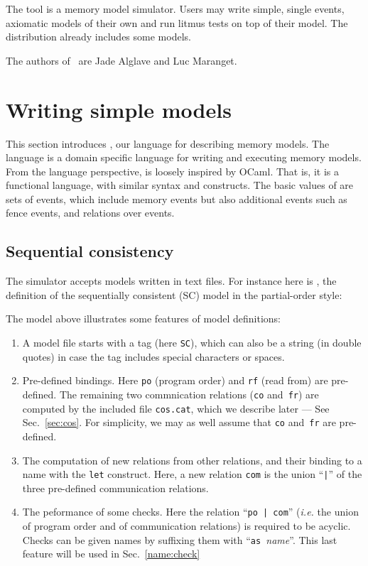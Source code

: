 
The tool \herd{} is a memory model simulator.
Users may write simple, single events,
axiomatic models of their own and run litmus tests on top
of their model.
The \herd{} distribution already includes some models.

The authors of~\herd{} are Jade Alglave and Luc Maranget.


\section{Writing simple models}
This section introduces \cat{}, our language for describing memory models.
The \cat{} language is a domain specific language for writing and executing
memory models. From the language perspective, \cat{} is loosely inspired
by OCaml. That is, it is a functional language, with similar syntax
and constructs.
The basic values of \cat{} are sets of events, which include memory events
but also additional events such as fence events,
and relations over events.


\subsection{Sequential consistency}
The simulator \herd{} accepts models written in text files.
For instance here is ,
the definition of the sequentially consistent (SC) model in the partial-order
style:

The model above illustrates some features of model definitions:
\begin{enumerate}
\item A model file starts with a tag (here \verb+SC+), which can also be a
string (in double quotes) in case the tag includes special characters or spaces.
\item Pre-defined bindings. Here \verb+po+ (program order)
and \texttt{rf} (read from) are pre-defined.
The remaining two commnication relations (\texttt{co} and~\texttt{fr})
are computed by the included file \verb+cos.cat+, which we describe later
--- See Sec.~\ref{sec:cos}.
For simplicity, we may as well assume that \verb+co+
and~\verb+fr+ are pre-defined.
\item The computation of new relations from other relations,
and their binding to a name with the \verb+let+ construct.
Here, a new relation \verb+com+ is the union ``\texttt{|}'' of
the three pre-defined communication relations.
\item The peformance of some checks. Here the relation ``\verb+po | com+''
(\emph{i.e.} the union of program order  and of  communication
relations) is required to be acyclic.
Checks can be given names by suffixing them with
``\texttt{as~}\textit{name}''.
This last feature will be used in Sec.~\ref{name:check}
\end{enumerate}

